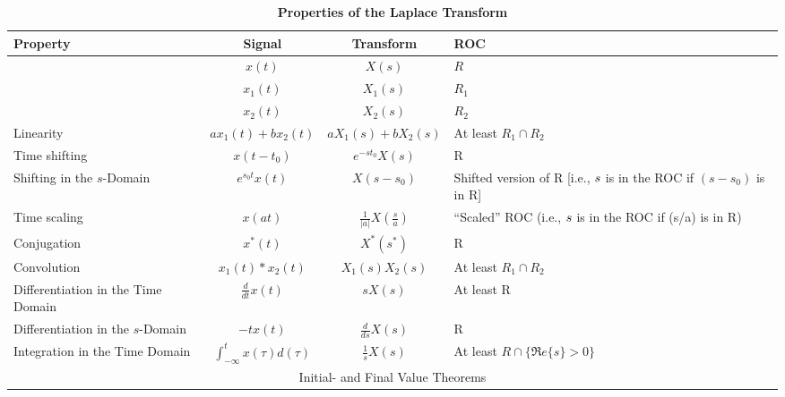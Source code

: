 \documentclass[12pt]{article}
\numberwithin{equation}{section}
\newcommand{\R}{\mbox{$\Re e\{s\}$}}
\begin{document}

%
%

\begin{table}[htbp]
  \begin{center}
\vspace*{-1.0in}

    \caption{\bf Properties of the Laplace Transform}
 \hspace*{-1.0in}
    \renewcommand{\arraystretch}{2}
    \begin{tabular}{l|c|c|p{2in}}
      {\bf Property} & {\bf Signal} & {\bf Transform} &{ \bf ROC}
      \vspace*{-3ex}\\
      \hline
      &$x(t)$ &$X(s)$ & $R$ \\
      &$x_{1}(t)$ &$X_{1}(s)$ & $R_{1}$ \\
      &$x_{2}(t)$ &$X_{2}(s)$ & $R_{2}$ \\
      Linearity &$ax_{1}(t) + bx_{2}(t)$&$aX_{1}(s) +
      bX_{2}(s)$ &At least $R_{1} \cap R_{2}$ \\
      Time shifting                          %
      &$x(t-t_{0})$ & $e^{-st_{0}}X(s)$ &R \\
      Shifting in the $s$-Domain                          %
      &$e^{s_{0}t}x(t)$ & $X(s-s_{0})$
      & Shifted version of R [i.e., $s\/$ is in the
      ROC if $(s-s_{0})$ is in R] \\
      Time scaling                          %
      &$x(at)$
      &$\displaystyle\frac{1}{|a|}X\left(
        \displaystyle\frac{s}{a}
      \right)$ & ``Scaled'' ROC (i.e., $s\/$ is in
      the ROC if (s/a) is in R) \\
       Conjugation                         %
       & \(x^* (t)\) & \(X^* (s^*)\) & R
      \\
      Convolution                          %
     &$x_{1}(t) \ast x_{2}(t)$
      &$X_{1}(s)X_{2}(s)$ &At least $R_{1} \cap
      R_{2}$\\
      Differentiation in the Time Domain                          %
      &$\displaystyle\frac{d}{dt}x(t)$
      &$sX(s)$ &At least R \\
      Differentiation in the $s$-Domain                                %
      &$-tx(t)$
      &$\displaystyle\frac{d}{ds}X(s)$ & R \\
      Integration in the Time Domain               %
      &$\displaystyle
      \int_{-\infty}^{t}x(\tau)d(\tau)$
      &$\displaystyle\frac{1}{s}X(s)$ &At least $R \cap \{\R >
      0\}$  \\
      \hline
\multicolumn{4}{c}{Initial- and Final Value Theorems} \\


\end{tabular}
\end{center}
\end{table}
\end{document}
